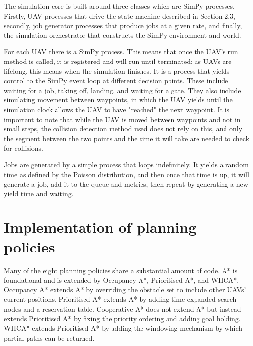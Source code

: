 The simulation core is built around three classes which are SimPy processes. Firstly, UAV processes that drive the state machine described in Section 2.3, secondly, job generator processes that produce jobs at a given rate, and finally, the simulation orchestrator that constructs the SimPy environment and world.\par

\vspace{1em}

For each UAV there is a SimPy process. This means that once the UAV's run method is called, it is registered and will run until terminated; as UAVs are lifelong, this means when the simulation finishes. It is a process that yields control to the SimPy event loop at different decision points. These include waiting for a job, taking off, landing, and waiting for a gate. They also include simulating movement between waypoints, in which the UAV yields until the simulation clock allows the UAV to have "reached" the next waypoint. It is important to note that while the UAV is moved between waypoints and not in small steps, the collision detection method used does not rely on this, and only the segment between the two points and the time it will take are needed to check for collisions. \par

\vspace{1em}

Jobs are generated by a simple process that loops indefinitely. It yields a random time as defined by the Poisson distribution, and then once that time is up, it will generate a job, add it to the queue and metrics, then repeat by generating a new yield time and waiting. 

\section{Implementation of planning policies}

Many of the eight planning policies share a substantial amount of code. A* is foundational and is extended by Occupancy A*, Prioritised A*, and WHCA*. Occupancy A* extends A* by overriding the obstacle set to include other UAVs' current positions. Prioritised A* extends A* by adding time expanded search nodes and a reservation table. Cooperative A* does not extend A* but instead extends Prioritised A* by fixing the priority ordering and adding goal holding. WHCA* extends Prioritised A* by adding the windowing mechanism by which partial paths can be returned. \par

